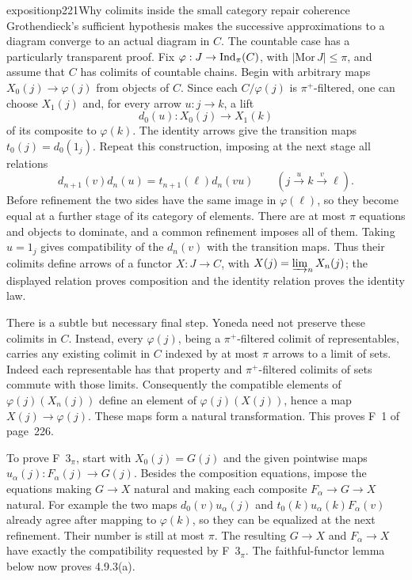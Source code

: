 \begin{dcomment}{exposition}{p221}{Why colimits inside the small category repair coherence}
Grothendieck's sufficient hypothesis makes the successive approximations to a diagram converge to an actual diagram in $C$. The countable case has a particularly transparent proof. Fix $\varphi:J\to\operatorname{Ind}_\pi(C)$, with $|\mathrm{Mor}\,J|\leq\pi$, and assume that $C$ has colimits of countable chains. Begin with arbitrary maps $X_0(j)\to\varphi(j)$ from objects of $C$. Since each $C/\varphi(j)$ is $\pi^+$-filtered, one can choose $X_1(j)$ and, for every arrow $u:j\to k$, a lift
\[
 d_0(u):X_0(j)\longrightarrow X_1(k)
\]
of its composite to $\varphi(k)$. The identity arrows give the transition maps $t_0(j)=d_0(1_j)$. Repeat this construction, imposing at the next stage all relations
\[
 d_{n+1}(v)d_n(u)
 =t_{n+1}(\ell)d_n(vu)
 \qquad(j\xrightarrow{u}k\xrightarrow{v}\ell).
\]
Before refinement the two sides have the same image in $\varphi(\ell)$, so they become equal at a further stage of its category of elements. There are at most $\pi$ equations and objects to dominate, and a common refinement imposes all of them. Taking $u=1_j$ gives compatibility of the $d_n(v)$ with the transition maps. Thus their colimits define arrows of a functor $X:J\to C$, with $X(j)=\varinjlim_nX_n(j)$; the displayed relation proves composition and the identity relation proves the identity law.

There is a subtle but necessary final step. Yoneda need not preserve these colimits in $C$. Instead, every $\varphi(j)$, being a $\pi^+$-filtered colimit of representables, carries any existing colimit in $C$ indexed by at most $\pi$ arrows to a limit of sets. Indeed each representable has that property and $\pi^+$-filtered colimits of sets commute with those limits. Consequently the compatible elements of $\varphi(j)(X_n(j))$ define an element of $\varphi(j)(X(j))$, hence a map $X(j)\to\varphi(j)$. These maps form a natural transformation. This proves F~1 of page~226.

To prove F~$3_\pi$, start with $X_0(j)=G(j)$ and the given pointwise maps $u_\alpha(j):F_\alpha(j)\to G(j)$. Besides the composition equations, impose the equations making $G\to X$ natural and making each composite $F_\alpha\to G\to X$ natural. For example the two maps $d_0(v)u_\alpha(j)$ and $t_0(k)u_\alpha(k)F_\alpha(v)$ already agree after mapping to $\varphi(k)$, so they can be equalized at the next refinement. Their number is still at most $\pi$. The resulting $G\to X$ and $F_\alpha\to X$ have exactly the compatibility requested by F~$3_\pi$. The faithful-functor lemma below now proves 4.9.3(a).


\end{dcomment}
